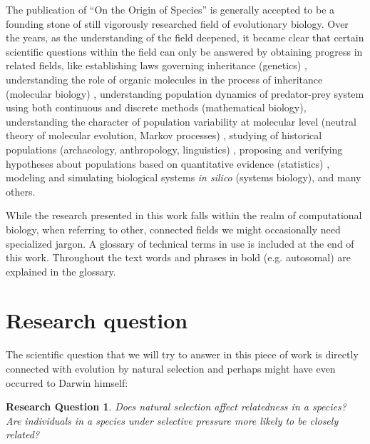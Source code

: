 \documentclass{l4proj}
\newtheorem*{quest}{Research Question}
\begin{document}
The publication of ``On the Origin of Species'' \parencite{darwin59} is generally accepted to be a founding stone of still vigorously researched field of evolutionary biology. Over the years, as the understanding of the field deepened, it became clear that certain scientific questions within the field can only be answered by obtaining progress in related fields, like establishing laws governing inheritance (genetics) \parencite{mendel}, understanding the role of organic molecules in the process of inheritance (molecular biology) \parencite{watson53}, understanding population dynamics of predator-prey system using both continuous and discrete methods (mathematical biology), understanding the character of population variability at molecular level (neutral theory of molecular evolution, Markov processes) \parencite{kimura68, dayhoff73}, studying of historical populations (archaeology, anthropology, linguistics) \parencite{dubois}, proposing and verifying hypotheses about populations based on quantitative evidence (statistics) \parencite{bronzeAgeEurasia}, modeling and simulating biological systems \textit{in silico} (systems biology), and many others.

While the research presented in this work falls within the realm of computational biology, when referring to other, connected fields we might occasionally need specialized jargon. A glossary of technical terms in use is included at the end of this work. Throughout the text words and phrases in bold (e.g. \gls{autosomal}) are explained in the glossary.

\section{Research question}\label{TMRCA}
The scientific question that we will try to answer in this piece of work is directly connected with evolution by natural selection and perhaps might have even occurred to Darwin himself:

\begin{quest}
Does natural selection affect relatedness in a species? Are individuals in a species under selective pressure more likely to be closely related?
\end{quest}
\end{document}
